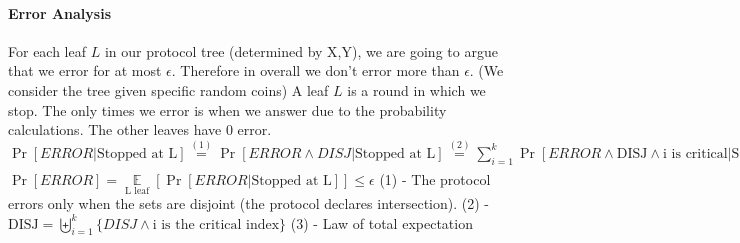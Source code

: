 \documentclass{article}
\theoremstyle{plain}
\begin{document}
\paragraph{Error Analysis}
For each leaf $L$ in our protocol tree (determined by X,Y), we are going to argue that we error for at most $\epsilon$. Therefore in overall we don't error more than $\epsilon$. (We consider the tree given specific random coins) \newline
A leaf $L$ is a round in which we stop. \newline
The only times we error is when we answer due to the probability calculations. The other leaves have 0 error.\newline
$\Pr[ERROR | \text{Stopped at L}] \overset{(1)}{=} \Pr[ERROR \land DISJ | \text{Stopped at L}] \overset{(2)}{=} \sum\limits_{i=1}^k \Pr[ERROR \land \text{DISJ} \land \text{i is critical}| \text{Stopped at L}] \overset{(3)}{=} \sum\limits_{i=1}^k \underset{X_i=x_i}{\mathop{\mathbb{E}}}\Pr[ERROR \land \text{DISJ}\land \text{i is critical}| \text{Stopped at L} \land X_i=x_i] \leq \sum\limits_{i=1}^k \underset{X_i=x_i}{\mathop{\mathbb{E}}}[\frac{\epsilon}{k}] = \sum\limits_{i=1}^k \frac{\epsilon}{k} = \epsilon$ \newline
\newline
$\Pr[ERROR] = \underset{\text{L leaf}}{\mathop{\mathbb{E}}} [\Pr[ERROR | \text{Stopped at L}] ] \leq \epsilon $ \newline
(1) - The protocol errors only when the sets are disjoint (the protocol declares intersection). \newline
(2) - $  \text{DISJ} = \biguplus_{i=1}^{k}\{DISJ \land \text{i is the critical index} \} $ \newline
(3) - Law of total expectation
\end{document}
